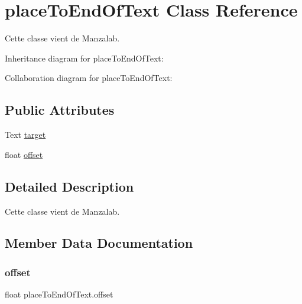 \hypertarget{classplace_to_end_of_text}{}\section{place\+To\+End\+Of\+Text Class Reference}
\label{classplace_to_end_of_text}


Cette classe vient de Manzalab.  




Inheritance diagram for place\+To\+End\+Of\+Text\+:


Collaboration diagram for place\+To\+End\+Of\+Text\+:
\subsection*{Public Attributes}
\begin{DoxyCompactItemize}
\item 
Text \hyperlink{classplace_to_end_of_text_a1b5a031f526e512ec375625809db35b4}{target}
\item 
float \hyperlink{classplace_to_end_of_text_a66fb83f49a64f92a2a18c0e3077c1db1}{offset}
\end{DoxyCompactItemize}


\subsection{Detailed Description}
Cette classe vient de Manzalab. 



\subsection{Member Data Documentation}
\mbox{\label{classplace_to_end_of_text_a66fb83f49a64f92a2a18c0e3077c1db1}} 
\subsubsection{\texorpdfstring{offset}{offset}}
{\footnotesize\ttfamily float place\+To\+End\+Of\+Text.\+offset}

\mbox{\label{classplace_to_end_of_text_a1b5a031f526e512ec375625809db35b4}} 
